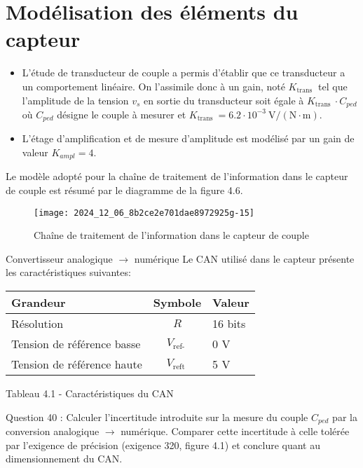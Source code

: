 \section{Modélisation des éléments du capteur}
\begin{itemize}
  \item L'étude de transducteur de couple a permis d'établir que ce transducteur a un comportement linéaire. On l'assimile donc à un gain, noté \(K_{\text {trans }}\) tel que l'amplitude de la tension \(v_{s}\) en sortie du transducteur soit égale à \(K_{\text {trans }} \cdot C_{p e d}\) où \(C_{p e d}\) désigne le couple à mesurer et \(K_{\text {trans }}=6.2 \cdot 10^{-3} \mathrm{~V} /(\mathrm{N} \cdot \mathrm{m})\).
  \item L'étage d'amplification et de mesure d'amplitude est modélisé par un gain de valeur \(K_{a m p l}=4\).
\end{itemize}

Le modèle adopté pour la chaîne de traitement de l'information dans le capteur de couple est résumé par le diagramme de la figure 4.6.\\

\begin{figure}[!htb]
\begin{center}
\texttt{[image: 2024\_12\_06\_8b2ce2e701dae8972925g-15]}
\caption{Chaîne de traitement de l'information dans le capteur de couple \label{fig11}}
\end{center}
\end{figure}

Convertisseur analogique \(\rightarrow\) numérique Le CAN utilisé dans le capteur présente les caractéristiques suivantes:

\begin{center}
\begin{tabular}{lcl}
Grandeur & Symbole & Valeur \\
\hline
Résolution & \(R\) & 16 bits \\
Tension de référence basse & \(V_{\text {ref- }}\) & 0 V \\
Tension de référence haute & \(V_{\text {reft }}\) & 5 V \\
\hline
\end{tabular}
\end{center}

Tableau 4.1 - Caractéristiques du CAN

Question 40 : Calculer l'incertitude introduite sur la mesure du couple \(C_{p e d}\) par la conversion analogique \(\rightarrow\) numérique. Comparer cette incertitude à celle tolérée par l'exigence de précision (exigence 320, figure 4.1) et conclure quant au dimensionnement du CAN.

